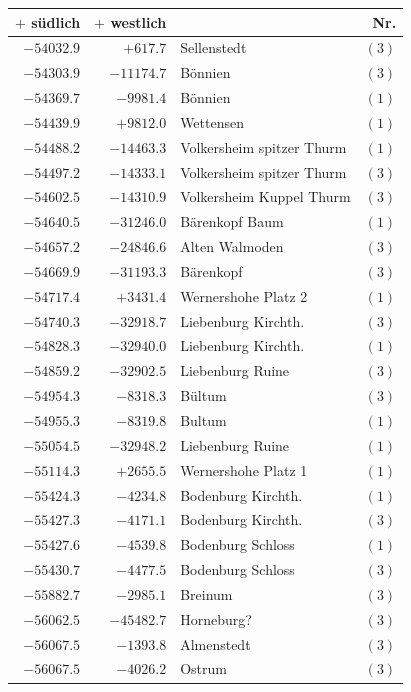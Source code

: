 \begin{center}\begingroup\fontsize{8}{9}\selectfont
\setlength{\tabcolsep}{4pt}
\begin{tabular}{r|r|p{170pt}|r}\hline
\(+\) südlich&\(+\) westlich&&Nr.\\\hline
\(-54032.9\)&\(+617.7\)&Sellenstedt&\((3)\)\\
\(-54303.9\)&\(-11174.7\)&Bönnien&\((3)\)\\
\(-54369.7\)&\(-9981.4\)&Bönnien&\((1)\)\\
\(-54439.9\)&\(+9812.0\)&Wettensen&\((1)\)\\
\(-54488.2\)&\(-14463.3\)&Volkersheim spitzer Thurm&\((1)\)\\
\(-54497.2\)&\(-14333.1\)&Volkersheim spitzer Thurm&\((3)\)\\
\(-54602.5\)&\(-14310.9\)&Volkersheim Kuppel Thurm&\((3)\)\\
\(-54640.5\)&\(-31246.0\)&Bärenkopf Baum&\((1)\)\\
\(-54657.2\)&\(-24846.6\)&Alten Walmoden&\((3)\)\\
\(-54669.9\)&\(-31193.3\)&Bärenkopf&\((3)\)\\
\(-54717.4\)&\(+3431.4\)&Wernershohe Platz 2&\((1)\)\\
\(-54740.3\)&\(-32918.7\)&Liebenburg Kirchth.&\((3)\)\\
\(-54828.3\)&\(-32940.0\)&Liebenburg Kirchth.&\((1)\)\\
\(-54859.2\)&\(-32902.5\)&Liebenburg Ruine&\((3)\)\\
\(-54954.3\)&\(-8318.3\)&Bültum&\((3)\)\\
\(-54955.3\)&\(-8319.8\)&Bultum&\((1)\)\\
\(-55054.5\)&\(-32948.2\)&Liebenburg Ruine&\((1)\)\\
\(-55114.3\)&\(+2655.5\)&Wernershohe Platz 1&\((1)\)\\
\(-55424.3\)&\(-4234.8\)&Bodenburg Kirchth.&\((1)\)\\
\(-55427.3\)&\(-4171.1\)&Bodenburg Kirchth.&\((3)\)\\
\(-55427.6\)&\(-4539.8\)&Bodenburg Schloss&\((1)\)\\
\(-55430.7\)&\(-4477.5\)&Bodenburg Schloss&\((3)\)\\
\(-55882.7\)&\(-2985.1\)&Breinum&\((3)\)\\
\(-56062.5\)&\(-45482.7\)&Horneburg?&\((3)\)\\
\(-56067.5\)&\(-1393.8\)&Almenstedt&\((3)\)\\
\(-56067.5\)&\(-4026.2\)&Ostrum&\((3)\)\\

\end{tabular}
\end{center}
